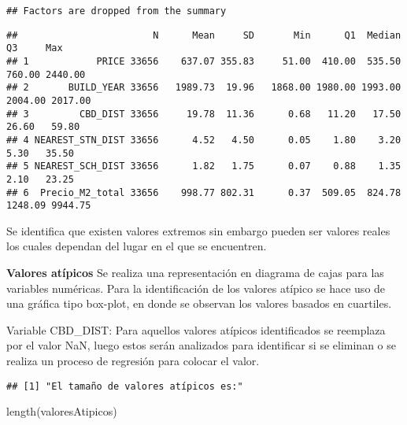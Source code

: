 \documentclass[
]{article}
\newenvironment{Shaded}{\begin{snugshade}}{\end{snugshade}}
\newcommand{\FunctionTok}[1]{\textcolor[rgb]{0.00,0.00,0.00}{#1}}
\newcommand{\NormalTok}[1]{#1}
\newcommand{\OtherTok}[1]{\textcolor[rgb]{0.56,0.35,0.01}{#1}}
\newcommand{\SpecialCharTok}[1]{\textcolor[rgb]{0.00,0.00,0.00}{#1}}
\newcommand{\StringTok}[1]{\textcolor[rgb]{0.31,0.60,0.02}{#1}}
\begin{document}
\begin{verbatim}
## Factors are dropped from the summary
\end{verbatim}

\begin{verbatim}
##                        N      Mean     SD       Min      Q1  Median      Q3     Max
## 1            PRICE 33656    637.07 355.83     51.00  410.00  535.50  760.00 2440.00
## 2       BUILD_YEAR 33656   1989.73  19.96   1868.00 1980.00 1993.00 2004.00 2017.00
## 3         CBD_DIST 33656     19.78  11.36      0.68   11.20   17.50   26.60   59.80
## 4 NEAREST_STN_DIST 33656      4.52   4.50      0.05    1.80    3.20    5.30   35.50
## 5 NEAREST_SCH_DIST 33656      1.82   1.75      0.07    0.88    1.35    2.10   23.25
## 6  Precio_M2_total 33656    998.77 802.31      0.37  509.05  824.78 1248.09 9944.75
\end{verbatim}

Se identifica que existen valores extremos sin embargo pueden ser
valores reales los cuales dependan del lugar en el que se encuentren.

\textbf{Valores atípicos} Se realiza una representación en diagrama de
cajas para las variables numéricas. Para la identificación de los
valores atípico se hace uso de una gráfica tipo box-plot, en donde se
observan los valores basados en cuartiles.

Variable CBD\_DIST: Para aquellos valores atípicos identificados se
reemplaza por el valor NaN, luego estos serán analizados para
identificar si se eliminan o se realiza un proceso de regresión para
colocar el valor.

\begin{Shaded}
\end{Shaded}

\begin{verbatim}
## [1] "El tamaño de valores atípicos es:"
\end{verbatim}

\begin{Shaded}
\begin{Highlighting}[]
\FunctionTok{length}\NormalTok{(valoresAtipicos)}
\end{Highlighting}
\end{Shaded}
\end{document}
